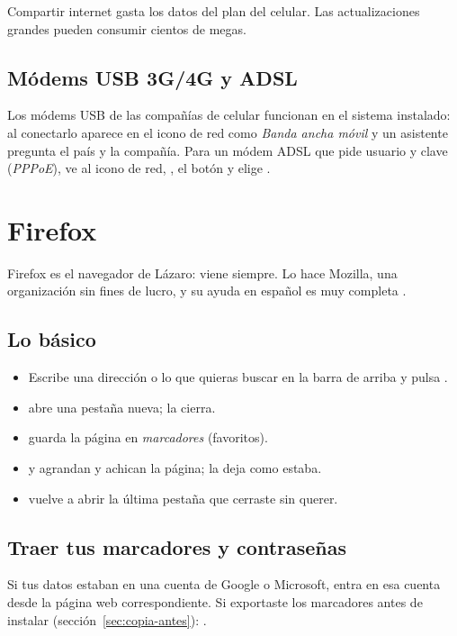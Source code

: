 \begin{cuidado}
Compartir internet gasta los datos del plan del celular. Las
actualizaciones grandes pueden consumir cientos de megas.
\end{cuidado}

\subsection{Módems USB 3G/4G y ADSL}
Los módems USB de las compañías de celular funcionan en el sistema
instalado: al conectarlo aparece en el icono de red como
\emph{Banda ancha móvil} y un asistente pregunta el país y la compañía.
Para un módem ADSL que pide usuario y clave (\emph{PPPoE}), ve al icono de
red, , el botón \menu{+} y elige
.

\section{Firefox}\label{sec:firefox}

Firefox es el navegador de Lázaro: viene siempre. Lo hace Mozilla, una
organización sin fines de lucro, y su ayuda en español es muy completa
\cite{firefox-ayuda}.


\subsection{Lo básico}
\begin{itemize}
  \item Escribe una dirección o lo que quieras buscar en la barra de
        arriba y pulsa .
  \item {} abre una pestaña nueva;  la cierra.
  \item {} guarda la página en \emph{marcadores} (favoritos).
  \item \keys{\ctrl + +} y \keys{\ctrl + -} agrandan y achican la página;
         la deja como estaba.
  \item {} vuelve a abrir la última pestaña que
        cerraste sin querer.
\end{itemize}

\subsection{Traer tus marcadores y contraseñas}
Si tus datos estaban en una cuenta de Google o Microsoft, entra en esa
cuenta desde la página web correspondiente. Si exportaste los marcadores
antes de instalar (sección~\ref{sec:copia-antes}):
.

